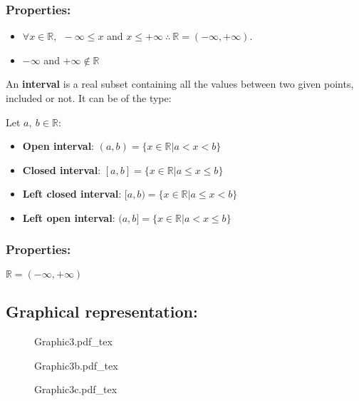 \documentclass[12pt, a4paper]{book}
\newcommand{\incfig}[1]{%
\def\svgscale{1}
{#1.pdf_tex}
}
\begin{document}
\subsubsection*{Properties:}

\begin{itemize}
  \item $\forall x \in \mathbb{R}, \ \ - \infty \leq x$ and $x \leq + \infty \ \therefore \ \mathbb{R}=(-\infty, +\infty).$
  \item $-\infty$ and $+\infty \notin \mathbb{R}$
\end{itemize}

\begin{defn}
  An \textbf{interval} is a real subset containing all the values between two given points, included or not. It can be of the type: 
  
  Let $a, \ b \in \mathbb{R}$:
  \begin{itemize}
    \item \textbf{Open interval}: $(a,b) = \{x\in \mathbb{R} \vert a < x < b\}$
    \item \textbf{Closed interval}: $[a,b] = \{x\in \mathbb{R} \vert a \leq x \leq b\}$
    \item \textbf{Left closed interval}: $[a,b) = \{x\in \mathbb{R} \vert a \leq x<b\}$
    \item \textbf{Left open interval}: $(a,b] = \{x\in \mathbb{R} \vert a < x \leq b\}$
  \end{itemize}
\end{defn}

\subsubsection*{Properties:} $\mathbb{R} = (-\infty , +\infty)$

\subsection*{Graphical representation:}

\begin{figure}[H]
  \centering
  \incfig{Graphic3}
\end{figure}

\begin{figure}[H]
  \centering
  \incfig{Graphic3b}
\end{figure}

\begin{figure}[H]
  \centering
  \incfig{Graphic3c}
\end{figure}
\end{document}
